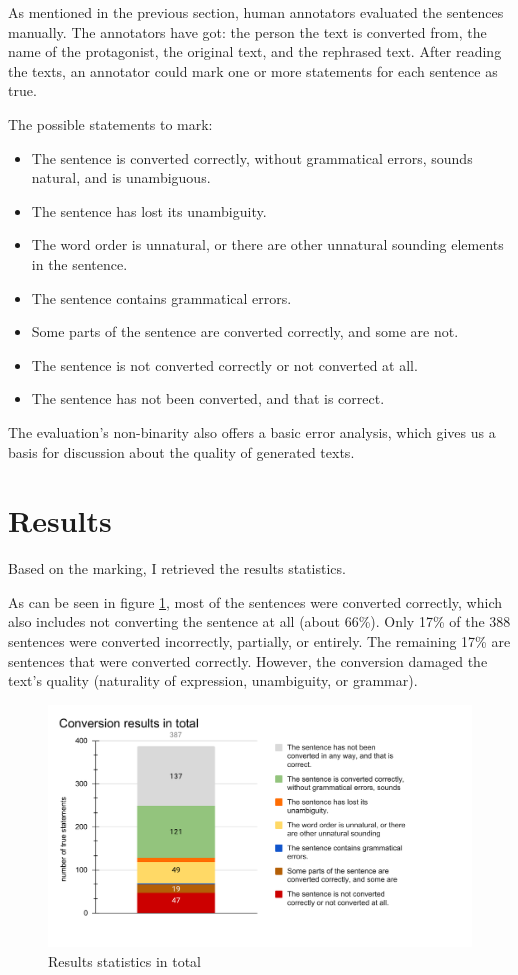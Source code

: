 As mentioned in the previous section, human annotators evaluated the sentences manually. The annotators have got: the person the text is converted from, the name of the protagonist, the original text, and the rephrased text. After reading the texts, an annotator could mark one or more statements for each sentence as true.

The possible statements to mark:

\begin{itemize}
	\item The sentence is converted correctly, without grammatical errors, sounds natural, and is unambiguous.
	\item The sentence has lost its unambiguity.
	\item The word order is unnatural, or there are other unnatural sounding elements in the sentence.
	\item The sentence contains grammatical errors.
	\item Some parts of the sentence are converted correctly, and some are not.
	\item The sentence is not converted correctly or not converted at all.
	\item The sentence has not been converted, and that is correct.
\end{itemize}

The evaluation's non-binarity also offers a basic error analysis, which gives us a basis for discussion about the quality of generated texts.

\section{Results}

Based on the marking, I retrieved the results statistics.

As can be seen in figure \ref{fig:eval-total}, most of the sentences were converted correctly, which also includes not converting the sentence at all (about 66\%). Only 17\% of the 388 sentences were converted incorrectly, partially, or entirely. The remaining 17\% are sentences that were converted correctly. However, the conversion damaged the text's quality (naturality of expression, unambiguity, or grammar).

\begin{figure}[!ht]
\includegraphics[width=\textwidth]{data/Eval-Total.pdf}
\caption{Results statistics in total}
\label{fig:eval-total}
\end{figure}

